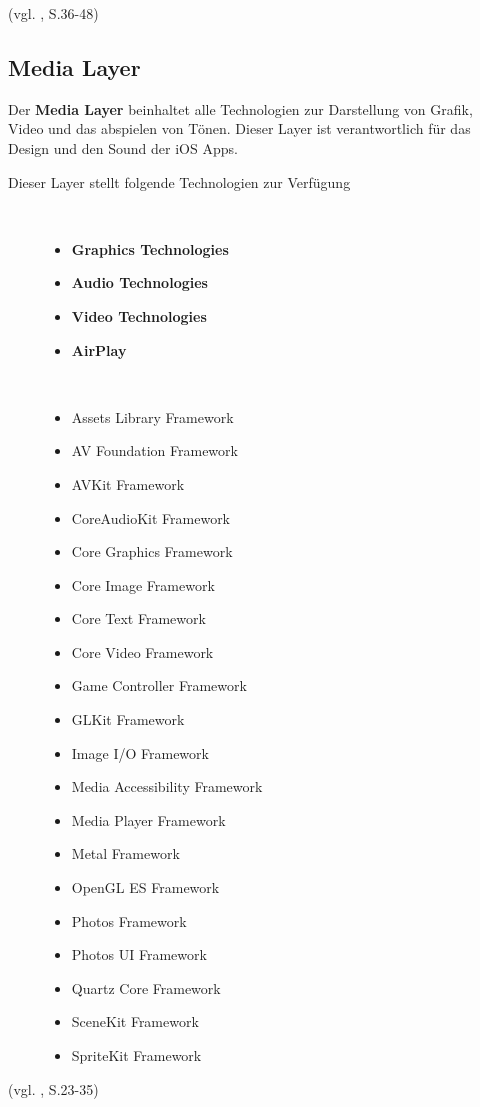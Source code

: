 (vgl. \cite{Apple[6]}, S.36-48)
\subsection{Media Layer}
\label{sec:MediaLayer}		
Der \textbf{Media Layer} beinhaltet alle Technologien zur Darstellung von Grafik, Video und das abspielen von Tönen. Dieser Layer ist verantwortlich für das Design und den Sound der iOS Apps. 

\begin{description}
	\item[Dieser Layer stellt folgende Technologien zur Verfügung]~\par
    \begin{itemize}
		\item \textbf{Graphics Technologies}
		\item \textbf{Audio Technologies}
		\item \textbf{Video Technologies}
		\item \textbf{AirPlay}
    \end{itemize}

    \item[\parbox{\textwidth} {Das Media Layer Framework beinhaltet folgende Frameworks}]~\par
	\begin{multicols}{2}
	\begin{itemize}
		\item Assets Library Framework
		\item AV Foundation Framework
		\item AVKit Framework
		\item CoreAudioKit Framework
		\item Core Graphics Framework
		\item Core Image Framework
		\item Core Text Framework
		\item Core Video Framework
		\item Game Controller Framework
		\item GLKit Framework
		\item Image I/O Framework
		\item Media Accessibility Framework
		\item Media Player Framework
		\item Metal Framework
		\item OpenGL ES Framework
		\item Photos Framework
		\item Photos UI Framework
		\item Quartz Core Framework
		\item SceneKit Framework
		\item SpriteKit Framework
         \end{itemize}
	\end{multicols}
\end{description}
(vgl. \cite{Apple[6]}, S.23-35)

